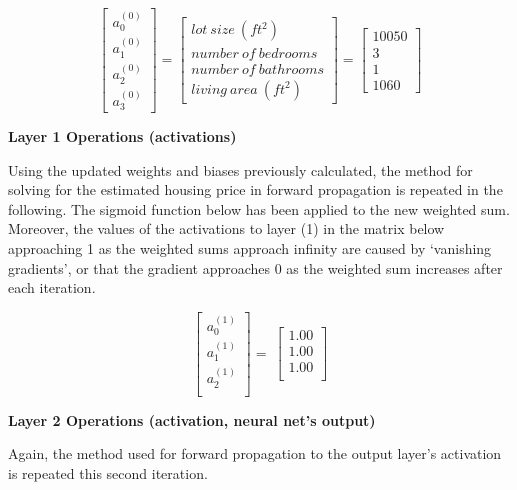 \documentclass[12pt,a4paper]{article}
\begin{document}
\begin{equation}
    \left[\begin{matrix}a_0^{(0)} \\ a_1^{(0)} \\ a_2^{(0)} \\ a_3^{(0)} \end{matrix}\right]= \left[\begin{matrix} lot \ size \ (ft^2) \\ number \ of \  bedrooms \\ number \  of \ bathrooms \\ living \ area \ (ft^2) \end{matrix}\right] =  \left[\begin{matrix} 10050 \\  3  \\ 1  \\ 1060\end{matrix}\right]
\end{equation}

\textbf{Layer 1 Operations (activations)}

Using the updated weights and biases previously calculated, the method for solving for the estimated housing price in forward propagation is repeated in the following. The sigmoid function below has been applied to the new weighted sum. Moreover, the values of the activations to layer (1) in the matrix below approaching 1 as the weighted sums approach infinity are caused by ‘vanishing gradients’, or that the gradient approaches 0 as the weighted sum increases after each iteration.

\begin{equation}
\left[\begin{matrix}a_0^{\left(1\right)}\\a_1^{\left(1\right)}\\a_2^{\left(1\right)}\\\end{matrix}\right]=\ \left[\begin{matrix}1.00\\1.00\\1.00\\\end{matrix}\right]
\end{equation}

\hspace{}


\textbf{Layer 2 Operations (activation, neural net’s output)}

Again, the method used for forward propagation to the output layer’s activation is repeated this second iteration.
\end{document}
